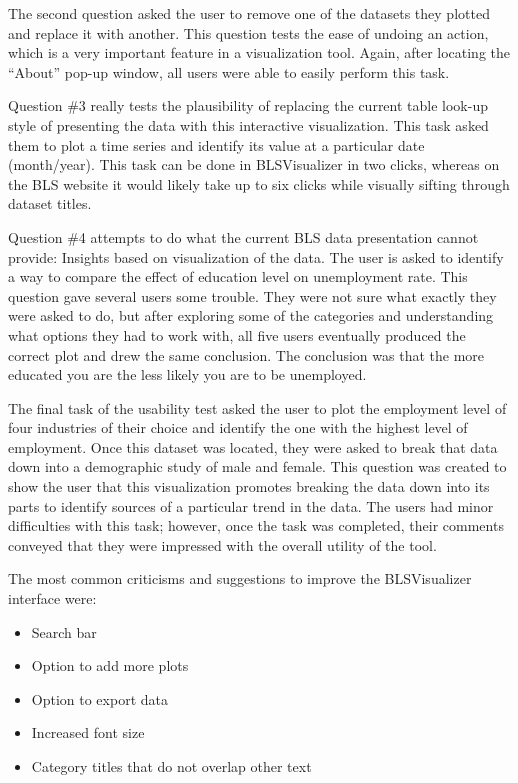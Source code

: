 \documentclass[11pt,letterpaper]{article}
\begin{document}
The second question asked the user to remove one of the datasets they plotted and replace it with another. This question tests the ease of undoing an action, which is a very important feature in a visualization tool. Again, after locating the ``About'' pop-up window, all users were able to easily perform this task.

Question \#3 really tests the plausibility of replacing the current table look-up style of presenting the data with this interactive visualization. This task asked them to plot a time series and identify its value at a particular date (month/year). This task can be done in BLSVisualizer in two clicks, whereas on the BLS website it would likely take up to six clicks while visually sifting through dataset titles.

Question \#4 attempts to do what the current BLS data presentation cannot provide: Insights based on visualization of the data. The user is asked to identify a way to compare the effect of education level on unemployment rate. This question gave several users some trouble. They were not sure what exactly they were asked to do, but after exploring some of the categories and understanding what options they had to work with, all five users eventually produced the correct plot and drew the same conclusion. The conclusion was that the more educated you are the less likely you are to be unemployed.

The final task of the usability test asked the user to plot the employment level of four industries of their choice and identify the one with the highest level of employment. Once this dataset was located, they were asked to break that data down into a demographic study of male and female. This question was created to show the user that this visualization promotes breaking the data down into its parts to identify sources of a particular trend in the data. The users had minor difficulties with this task; however, once the task was completed, their comments conveyed that they were impressed with the overall utility of the tool.

The most common criticisms and suggestions to improve the BLSVisualizer interface were:

\begin{itemize}
  \item Search bar
  \item Option to add more plots
  \item Option to export data
  \item Increased font size
  \item Category titles that do not overlap other text
\end{itemize}
\end{document}
